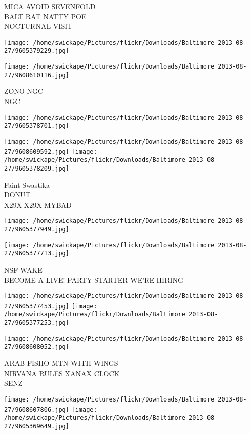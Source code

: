 \documentclass[10pt,letterpaper]{article}
\begin{document}
MICA AVOID SEVENFOLD\\
BALT RAT NATTY POE\\
NOCTURNAL VISIT
\pagebreak

\texttt{[image: /home/swickape/Pictures/flickr/Downloads/Baltimore 2013-08-27/9605379229.jpg]}

\vspace{0.25in}
\texttt{[image: /home/swickape/Pictures/flickr/Downloads/Baltimore 2013-08-27/9608610116.jpg]}

ZONO NGC\\
NGC
\pagebreak

\texttt{[image: /home/swickape/Pictures/flickr/Downloads/Baltimore 2013-08-27/9605378701.jpg]}

\vspace{0.25in}
\texttt{[image: /home/swickape/Pictures/flickr/Downloads/Baltimore 2013-08-27/9608609592.jpg]}
\texttt{[image: /home/swickape/Pictures/flickr/Downloads/Baltimore 2013-08-27/9605378209.jpg]}

Faint Swastika\\
DONUT\\
X29X X29X MYBAD
\pagebreak

\texttt{[image: /home/swickape/Pictures/flickr/Downloads/Baltimore 2013-08-27/9605377949.jpg]}

\vspace{0.25in}
\texttt{[image: /home/swickape/Pictures/flickr/Downloads/Baltimore 2013-08-27/9605377713.jpg]}

NSF WAKE\\
BECOME A LIVE! PARTY STARTER WE'RE HIRING
\pagebreak

\texttt{[image: /home/swickape/Pictures/flickr/Downloads/Baltimore 2013-08-27/9605377453.jpg]}
\texttt{[image: /home/swickape/Pictures/flickr/Downloads/Baltimore 2013-08-27/9605377253.jpg]}

\vspace{0.25in}
\texttt{[image: /home/swickape/Pictures/flickr/Downloads/Baltimore 2013-08-27/9608608052.jpg]}

ARAB FISHO MTN WITH WINGS\\
NIRVANA RULES XANAX CLOCK\\
SENZ
\pagebreak

\texttt{[image: /home/swickape/Pictures/flickr/Downloads/Baltimore 2013-08-27/9608607806.jpg]}
\texttt{[image: /home/swickape/Pictures/flickr/Downloads/Baltimore 2013-08-27/9605369649.jpg]}
\end{document}
